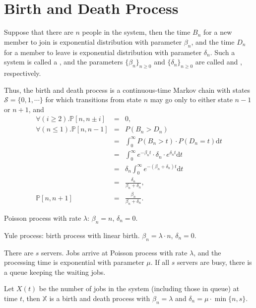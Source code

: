 \section{Birth and Death Process}

\begin{definition}
Suppose that there are $ n $ people in the system, then the time $ B_{n} $ for a new member to join is exponential distribution with parameter $ \beta_{n} $, and the time $ D_{n} $ for a member to leave is exponential distribution with parameter $ \delta_{n} $. Such a system is called a , and the parameters $ \{ \beta_{n} \}_{n \ge 0} $ and $ \{ \delta_{n} \}_{n \ge 0} $ are called  and , respectively.

Thus, the birth and death process is a continuous-time Markov chain with states $ \mathcal{S} = \{ 0, 1, \cdots \} $ for which transitions from state $ n $ may go only to either state $ n - 1 $ or $ n + 1 $, and
\begin{eqnarray*}
\forall(i \ge 2). \mathbb{P}[n, n \pm i] & = & 0, \\
\forall(n \le 1). \mathbb{P}[n, n - 1]
    & = & P(B_{n} > D_{n}) \\
    & = & \int_{0}^{\infty} P(B_{n} > t) \cdot P(D_{n} = t) \mathrm{d}t \\
    & = & \int_{0}^{\infty} e^{-\beta_{n}t} \cdot \delta_{n} \cdot e^{\delta_{n}t} \mathrm{d}t \\
    & = & \delta_{n} \int_{0}^{\infty} e^{-(\beta_{n} + \delta_{n})t} \mathrm{d}t \\
    & = & \frac{\delta_{n}}{\beta_{n} + \delta_{n}}, \\
\mathbb{P}[n, n + 1] & = & \frac{\beta_{n}}{\beta_{n} + \delta_{n}}.
\end{eqnarray*}
\end{definition}

\begin{example}
Poisson process with rate $ \lambda $: $ \beta_{n} = n $, $ \delta_{n} = 0 $.
\end{example}

\begin{example}
Yule process: birth process with linear birth. $ \beta_{n} = \lambda \cdot n $, $ \delta_{n} = 0 $.
\end{example}

\begin{example}
There are $ s $ servers. Jobs arrive at Poisson process with rate $ \lambda $, and the processing time is exponential with parameter $ \mu $. If all $ s $ servers are busy, there is a queue keeping the waiting jobs.

Let $ X(t) $ be the number of jobs in the system (including those in queue) at time $ t $, then $ \mathbb{X} $ is a birth and death process with $ \beta_{n} = \lambda $ and $ \delta_{n} = \mu \cdot \min \{n, s\} $.
\end{example}
